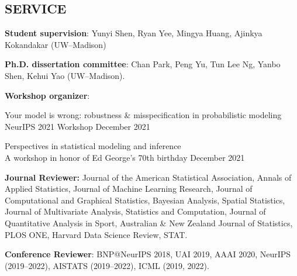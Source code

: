 \documentclass[margin]{res}
\begin{document}
\begin{resume}
\section{SERVICE}

\textbf{Student supervision}: Yunyi Shen, Ryan Yee, Mingya Huang, Ajinkya Kokandakar (UW--Madison)

\textbf{Ph.D. dissertation committee}: Chan Park, Peng Yu, Tun Lee Ng, Yanbo Shen, Kehui Yao (UW--Madison).

\textbf{Workshop organizer}: 

Your model is wrong: robustness \& misspecification in probabilistic modeling \\
NeurIPS 2021 Workshop \hfill December 2021

Perspectives in statistical modeling and inference \\
A workshop in honor of Ed George's 70th birthday \hfill December 2021


\textbf{Journal Reviewer:} Journal of the American Statistical Association, Annals of Applied Statistics, Journal of Machine Learning Research, Journal of Computational and Graphical Statistics, Bayesian Analysis, Spatial Statistics, Journal of Multivariate Analysis, Statistics and Computation, Journal of Quantitative Analysis in Sport, Australian \& New Zealand Journal of Statistics, PLOS ONE, Harvard Data Science Review, STAT. 

\textbf{Conference Reviewer}: BNP@NeurIPS 2018, UAI 2019, AAAI 2020,  NeurIPS (2019--2022), AISTATS (2019--2022), ICML (2019, 2022).
\end{resume} 
\end{document}
